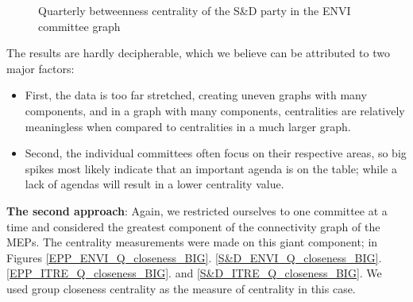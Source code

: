 \documentclass[lettersize,journal]{IEEEtran}
\begin{document}
\begin{figure}[h]
\begin{minipage}[b]{0.23\textwidth}
    \caption{Quarterly betweenness centrality of the S\&D party in the ENVI committee graph}
    \label{fig:btw_S&D}
  \end{minipage}

\end{figure}

The results are hardly decipherable, which we believe can be attributed to two major factors: 
\begin{itemize}
\item First, the data is too far stretched, creating uneven graphs with many components, and in a graph with many components, centralities are relatively meaningless when compared to centralities in a much larger graph.
\item Second, the individual committees often focus on their respective areas, so big spikes most likely indicate that an important agenda is on the table; while a lack of agendas will result in a lower centrality value.
\end{itemize}

\textbf{The second approach}: Again, we restricted ourselves to one committee at a time and considered the greatest component of the connectivity graph of the MEPs. The centrality measurements were made on this giant component; in Figures \ref{EPP_ENVI_Q_closeness_BIG}. \ref{S&D_ENVI_Q_closeness_BIG}. \ref{EPP_ITRE_Q_closeness_BIG}. and \ref{S&D_ITRE_Q_closeness_BIG}. We used group closeness centrality as the measure of centrality in this case.
\end{document}
